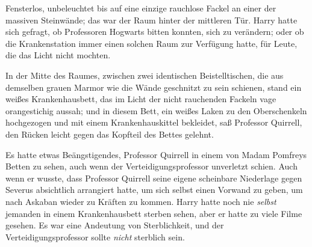 Fensterlos, unbeleuchtet bis auf eine einzige rauchlose Fackel an einer der massiven Steinwände; das war der Raum hinter der mittleren Tür. Harry hatte sich gefragt, ob Professoren Hogwarts bitten konnten, sich zu verändern; oder ob die Krankenstation immer einen solchen Raum zur Verfügung hatte, für Leute, die das Licht nicht mochten.

In der Mitte des Raumes, zwischen zwei identischen Beistelltischen, die aus demselben grauen Marmor wie die Wände geschnitzt zu sein schienen, stand ein weißes Krankenhausbett, das im Licht der nicht rauchenden Fackeln vage orangestichig aussah; und in diesem Bett, ein weißes Laken zu den Oberschenkeln hochgezogen und mit einem Krankenhauskittel bekleidet, saß Professor Quirrell, den Rücken leicht gegen das Kopfteil des Bettes gelehnt.

Es hatte etwas Beängstigendes, Professor Quirrell in einem von Madam Pomfreys Betten zu sehen, auch wenn der Verteidigungsprofessor unverletzt schien. Auch wenn er wusste, dass Professor Quirrell seine eigene scheinbare Niederlage gegen Severus absichtlich arrangiert hatte, um sich selbst einen Vorwand zu geben, um nach Askaban wieder zu Kräften zu kommen. Harry hatte noch nie \emph{selbst} jemanden in einem Krankenhausbett sterben sehen, aber er hatte zu viele Filme gesehen. Es war eine Andeutung von Sterblichkeit, und der Verteidigungsprofessor sollte \emph{nicht} sterblich sein.

